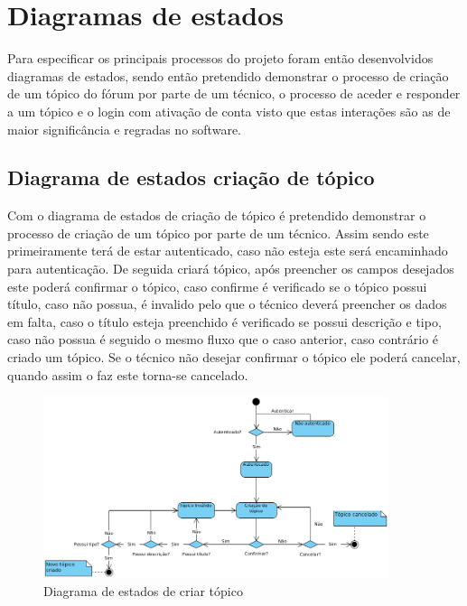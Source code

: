 \section{Diagramas de estados}
Para especificar os principais processos do projeto foram então desenvolvidos diagramas de estados,
sendo então pretendido demonstrar o processo de criação de um tópico do fórum por parte de um técnico, o 
processo de aceder e responder a um tópico e o login com ativação de conta
visto que estas interações são as de maior significância e regradas no software.

\subsection{Diagrama de estados criação de tópico}

Com o diagrama de estados de criação de tópico é pretendido demonstrar o processo de criação de um tópico 
por parte de um técnico. Assim sendo este primeiramente terá de estar autenticado, caso não esteja 
este será encaminhado para autenticação. De seguida criará tópico, após preencher os 
campos desejados este poderá confirmar o tópico, caso confirme é verificado se o tópico possui título, 
caso não possua, é invalido pelo que o técnico deverá preencher os dados em falta, caso o 
título esteja preenchido é verificado se possui descrição e tipo, caso não possua é seguido o mesmo fluxo que o 
caso anterior, caso contrário é criado um tópico. Se o técnico não desejar confirmar o tópico ele 
poderá cancelar, quando assim o faz este torna-se cancelado.

\begin{figure}[htb]
    \centering
    \includegraphics[width=0.9\textwidth]{images/diagramas/estados/criar_topico.png}
    \caption{Diagrama de estados de criar tópico}
    \label{fig:40}
\end{figure}

\newpage

